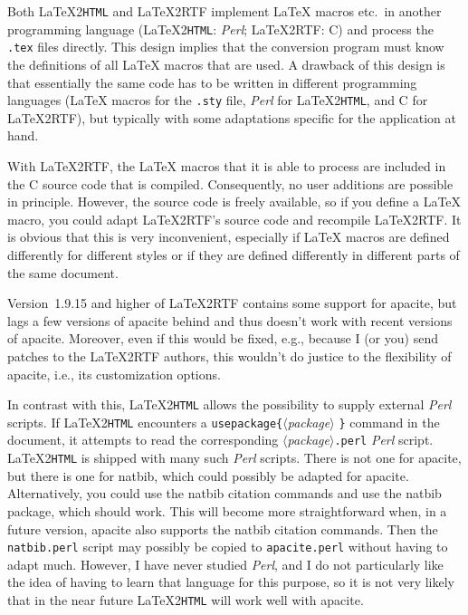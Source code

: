 \documentclass{article}
\makeatletter
\newcommand{\latextohtml}{\textup{\LaTeX2\texttt{HTML}}}%
\newcommand{\LaTeXrtf}{\textup{\LaTeX2RTF}}%
\newcommand{\Perl}{\textsl{Perl}}%
\newcommand{\pkg}[1]{\textsf{#1}}%
\newcommand{\fname}[1]{\texttt{#1}}%
\newcommand{\bs}{{\ttfamily \@backslashchar}}%
\newcommand{\opt}[1]{$\langle${\itshape #1}$\rangle$}%
\newcommand{\cmdtwo}[2]{{\mdseries\bs\texttt{#1\{}\opt{#2}%
                        \texttt{\}}}}%
\makeatother
\begin{document}
Both \latextohtml{} and \LaTeXrtf{} implement \LaTeX{} macros etc.\ in
another programming language (\latextohtml{}: \Perl{}; \LaTeXrtf{}: C) and
process the \fname{.tex} files directly. This design implies that the
conversion program must know the definitions of all \LaTeX{} macros that
are used. A drawback of this design is that essentially the same code has
to be written in different programming languages (\LaTeX{} macros for the
\fname{.sty} file, \Perl{} for \latextohtml{}, and C for \LaTeXrtf{}), but
typically with some adaptations specific for the application at hand.

With \LaTeXrtf{}, the \LaTeX{} macros that it is able to process are included
in the C source code that is compiled. Consequently, no user additions are
possible in principle. However, the source code is freely available, so if you
define a \LaTeX{} macro, you could adapt \LaTeXrtf{}'s source code and
recompile \LaTeXrtf{}. It is obvious that this is very inconvenient,
especially if \LaTeX{} macros are defined differently for different styles or
if they are defined differently in different parts of the same document.

Version~1.9.15 and higher of \LaTeXrtf{} contains some support for
\pkg{apacite}, but lags a few versions of \pkg{apacite} behind and thus
doesn't work with recent versions of \pkg{apacite}. Moreover, even if this
would be fixed, e.g., because I (or you) send patches to the \LaTeXrtf{}
authors, this wouldn't do justice to the flexibility of \pkg{apacite}, i.e.,
its customization options.

In contrast with this, \latextohtml{} allows the possibility to supply
external \Perl{} scripts. If \latextohtml{} encounters a
\cmdtwo{usepackage}{package} command in the document, it attempts to read the
corresponding \opt{package}\fname{.perl} \Perl{} script. \latextohtml{} is
shipped with many such \Perl{} scripts. There is not one for \pkg{apacite},
but there is one for \pkg{natbib}, which could possibly be adapted for
\pkg{apacite}. Alternatively, you could use the \pkg{natbib} citation commands
and use the \pkg{natbib} package, which should work. This will become more
straightforward when, in a future version, \pkg{apacite} also supports the
\pkg{natbib} citation commands. Then the \fname{natbib.perl} script may
possibly be copied to \fname{apacite.perl} without having to adapt much.
However, I have never studied \Perl{}, and I do not particularly like the
idea of having to learn that language for this purpose, so it is not very
likely that in the near future \latextohtml{} will work well with
\pkg{apacite}.
\end{document}
